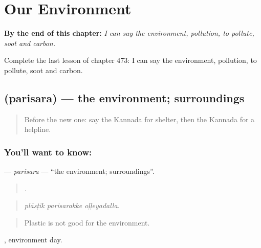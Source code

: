 
\chapter{Our Environment}
\label{ch:ka-our-environment}

\begin{chapteropening}
\textbf{By the end of this chapter:} \emph{I can say the environment, pollution, to pollute, soot and carbon.}

Complete the last lesson of chapter 473: I can say the environment, pollution, to pollute, soot and carbon.
\end{chapteropening}

\section[\texorpdfstring{\kn{ಪರಿಸರ} (parisara)}{ಪರಿಸರ (parisara)}]{ (parisara) — the environment; surroundings}

\label{lesson:KA-C473-parisara}



\begin{quote}
Before the new one: say the Kannada for shelter, then the Kannada for a helpline.
\end{quote}

\subsection*{You'll want to know: }
\textbf{} — \emph{parisara} — \textquotedblleft{}the environment; surroundings\textquotedblright{}.

\begin{quote}
  .
\end{quote}

\begin{quote}
\emph{plāsṭik parisarakke oḷḷeyadalla.}
\end{quote}

\begin{quote}
Plastic is not good for the environment.
\end{quote}

 , environment day.

